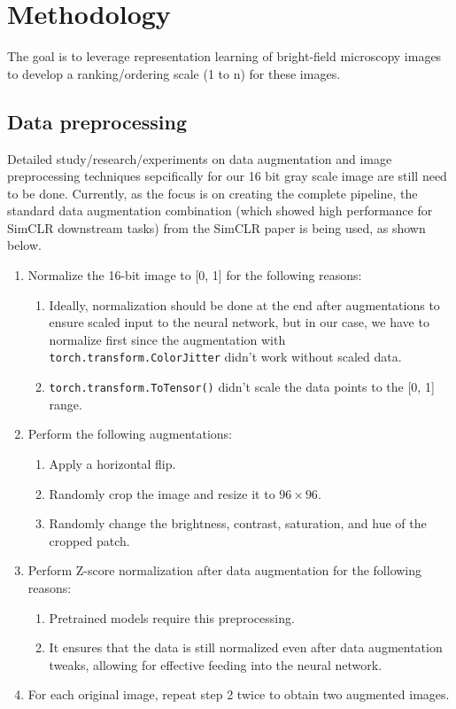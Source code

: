 \chapter{Methodology}\label{ch: Methodology}
The goal is to leverage representation learning of bright-field microscopy images to develop a ranking/ordering scale (1 to n) for these images. 




\section{Data preprocessing} \label{sec:data preprocessing}

Detailed study/research/experiments on data augmentation and image preprocessing techniques sepcifically for our 16 bit gray scale image are still need to be done.
Currently, as the focus is on creating the complete pipeline, the standard data augmentation combination (which showed high performance for SimCLR downstream tasks) from the SimCLR \cite{chen2020simple} paper is being used, as shown below.

\begin{enumerate}
  \item Normalize the 16-bit image to [0, 1] for the following reasons:
  \begin{enumerate}
      \item Ideally, normalization should be done at the end after augmentations to ensure scaled input to the neural network, but in our case, we have to normalize first since the augmentation with \texttt{torch.transform.ColorJitter} didn't work without scaled data.
      \item \texttt{torch.transform.ToTensor()} didn't scale the data points to the [0, 1] range.
  \end{enumerate}
  
  \item Perform the following augmentations:
  \begin{enumerate}
      \item Apply a horizontal flip.
      \item Randomly crop the image and resize it to $96 \times 96$.
      \item Randomly change the brightness, contrast, saturation, and hue of the cropped patch.
  \end{enumerate}

  \item Perform Z-score normalization after data augmentation for the following reasons:
  \begin{enumerate}
      \item Pretrained models require this preprocessing.
      \item It ensures that the data is still normalized even after data augmentation tweaks, allowing for effective feeding into the neural network.
  \end{enumerate}

  \item For each original image, repeat step 2 twice to obtain two augmented images.
\end{enumerate}


